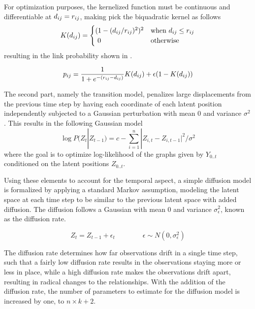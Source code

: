         For optimization purposes, the kernelized function must be continuous and differentiable at $\sub(d)=\sub(r)$, making \citeauthor{sarkar2005dynamic} pick the biquadratic kernel as follows
        \begin{equation}\label{eq:biquadratic-kernel}
            K(\sub(d))=
            \begin{cases}
                (1-(\sub(d)/\sub(r))^2)^2 & \text{when } \sub(d) \leq \sub(r) \\
                \ 0 & \text{otherwise}
            \end{cases}
        \end{equation}
        resulting in the link probability shown in .
        
        \begin{equation}\label{eq:dsnl-link-proba}
            \sub(p)=\frac{1}{1 + e^{-(\sub(r)-\sub(d))}} K(\sub(d)) + \epsilon(1-K(\sub(d)))
        \end{equation}
        
        
        The second part, namely the transition model, penalizes large displacements from the previous time step by having each coordinate of each latent position independently subjected to a Gaussian perturbation with mean 0 and variance $\sigma^2$. This results in the following Gaussian model
        \begin{equation}\label{eq:dsnl-transition}
            \log P(Z_t|Z_{t-1}) = c - \sum_{i=1}^n |Z_{i,t}-Z_{i,t-1}|^2 / \sigma^2
        \end{equation}
        where the goal is to optimize log-likelihood of the graphs given by $Y_{0..t}$ conditioned on the latent positions $Z_{0..t}$.
        
        Using these elements to account for the temporal aspect, a simple diffusion model is formalized by applying a standard Markov assumption, modeling the latent space at each time step to be similar to the previous latent space with added diffusion. The diffusion follows a Gaussian with mean 0 and variance $\sigma_\epsilon^2$, known as the diffusion rate.
        
        \begin{equation}\label{eq:dsnl-model}
            Z_t = Z_{t-1} + \epsilon_t \qquad\qquad \epsilon \sim N(0,\sigma_\epsilon^2)
        \end{equation}
        
        The diffusion rate determines how far observations drift in a single time step, such that a fairly low diffusion rate results in the observations staying more or less in place, while a high diffusion rate makes the observations drift apart, resulting in radical changes to the relationships. With the addition of the diffusion rate, the number of parameters to estimate for the diffusion model is increased by one, to $n \times k + 2$.
        
